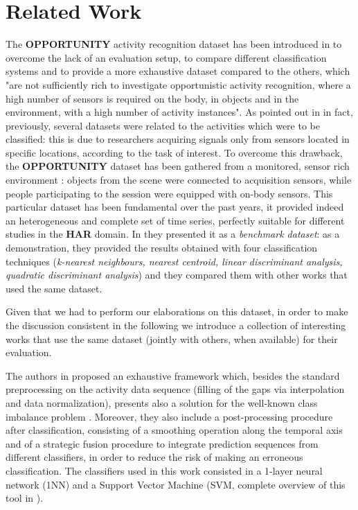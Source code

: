 
\section{Related Work}
\label{sec:related_work}
The \textbf{OPPORTUNITY} activity recognition dataset has been introduced in \cite{ComplexAct-2010} to overcome the lack of an evaluation setup, to compare different classification systems and to provide a more exhaustive dataset compared to the others, which "are not sufficiently rich to investigate opportunistic activity recognition, where a high number of sensors is required on the body, in objects and in the environment, with a high number of activity instances". As pointed out in \cite{Chavarriaga2013} in fact, previously, several datasets were related to the activities which were to be classified: this is due to researchers acquiring signals only from sensors located in specific locations, according to the task of interest.
To overcome this drawback, the \textbf{OPPORTUNITY} dataset has been gathered from a monitored, sensor rich environment  : objects from the scene were connected to acquisition sensors, while people participating to the session were equipped with on-body sensors. This particular dataset has been fundamental over the past years, it provided indeed an heterogeneous and complete set of time series, perfectly suitable for different studies in the \textbf{HAR} domain. In \cite{Chavarriaga2013} they presented it as a \textit{benchmark dataset}: as a demonstration, they provided the results obtained with four classification techniques (\textit{k-nearest neighbours, nearest centroid, linear discriminant analysis, quadratic discriminant analysis}) and they compared them with other works that used the same dataset. 

Given that we had to perform our elaborations on this dataset, in order to make the discussion consistent in the following we introduce a collection of interesting works that use the same dataset (jointly with others, when available) for their evaluation.

The authors in \cite{cao2012integrated} proposed an exhaustive framework which, besides the standard preprocessing on the activity data sequence (filling of the gaps via interpolation and data normalization), presents also a solution for the well-known class imbalance problem \cite{japkowicz2002class}. Moreover, they also include a post-processing procedure after classification, consisting of a smoothing operation along the temporal axis  and of a strategic fusion procedure to integrate prediction sequences from different classifiers, in order to reduce the risk of making an erroneous classification. The classifiers used in this work consisted in a 1-layer neural network (1NN) and a Support Vector Machine (SVM, complete overview of this tool in \cite{hearst1998support}). 

